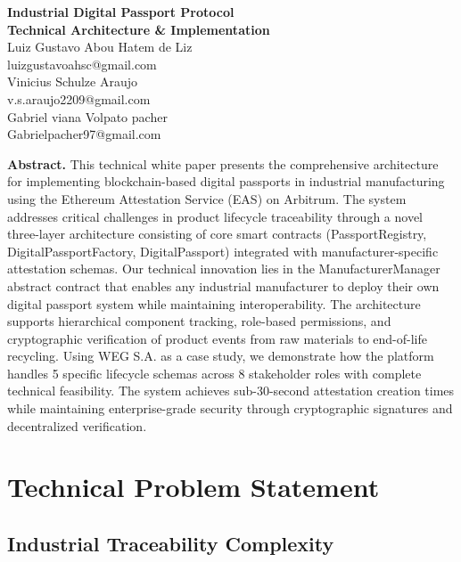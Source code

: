\documentclass[11pt,a4paper]{article}
\begin{document}
\begin{center}
\textbf{\Large Industrial Digital Passport Protocol}\\
\textbf{\large Technical Architecture \& Implementation}\\
\vspace{0.5cm}
Luiz Gustavo Abou Hatem de Liz\\
luizgustavoahsc@gmail.com\\
\vspace{0.3cm}
Vinicius Schulze Araujo\\
v.s.araujo2209@gmail.com\\
\vspace{0.3cm}
Gabriel viana Volpato pacher\\
Gabrielpacher97@gmail.com\\
\end{center}

\vspace{1cm}

\textbf{Abstract.} This technical white paper presents the comprehensive architecture for implementing blockchain-based digital passports in industrial manufacturing using the Ethereum Attestation Service (EAS) on Arbitrum. The system addresses critical challenges in product lifecycle traceability through a novel three-layer architecture consisting of core smart contracts (PassportRegistry, DigitalPassportFactory, DigitalPassport) integrated with manufacturer-specific attestation schemas. Our technical innovation lies in the ManufacturerManager abstract contract that enables any industrial manufacturer to deploy their own digital passport system while maintaining interoperability. The architecture supports hierarchical component tracking, role-based permissions, and cryptographic verification of product events from raw materials to end-of-life recycling. Using WEG S.A. as a case study, we demonstrate how the platform handles 5 specific lifecycle schemas across 8 stakeholder roles with complete technical feasibility. The system achieves sub-30-second attestation creation times while maintaining enterprise-grade security through cryptographic signatures and decentralized verification.

\section{Technical Problem Statement}

\subsection{Industrial Traceability Complexity}
\end{document}
